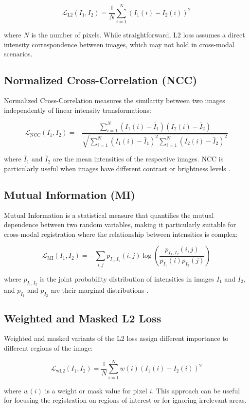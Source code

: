 \begin{equation}
    \mathcal{L}_{\text{L2}}(I_1, I_2) = \frac{1}{N} \sum_{i=1}^{N} (I_1(i) - I_2(i))^2
\end{equation}

where $N$ is the number of pixels. While straightforward, L2 loss assumes a direct intensity correspondence between images, which may not hold in cross-modal scenarios.

\subsection{Normalized Cross-Correlation (NCC)}

Normalized Cross-Correlation measures the similarity between two images independently of linear intensity transformations:

\begin{equation}
    \mathcal{L}_{\text{NCC}}(I_1, I_2) = -\frac{\sum_{i=1}^{N} (I_1(i) - \bar{I}_1)(I_2(i) - \bar{I}_2)}{\sqrt{\sum_{i=1}^{N} (I_1(i) - \bar{I}_1)^2 \sum_{i=1}^{N} (I_2(i) - \bar{I}_2)^2}}
\end{equation}

where $\bar{I}_1$ and $\bar{I}_2$ are the mean intensities of the respective images. NCC is particularly useful when images have different contrast or brightness levels \parencite{nccreg}.

\subsection{Mutual Information (MI)}

Mutual Information is a statistical measure that quantifies the mutual dependence between two random variables, making it particularly suitable for cross-modal registration where the relationship between intensities is complex:

\begin{equation}
    \mathcal{L}_{\text{MI}}(I_1, I_2) = -\sum_{i,j} p_{I_1,I_2}(i,j) \log\left(\frac{p_{I_1,I_2}(i,j)}{p_{I_1}(i)p_{I_2}(j)}\right)
\end{equation}

where $p_{I_1,I_2}$ is the joint probability distribution of intensities in images $I_1$ and $I_2$, and $p_{I_1}$ and $p_{I_2}$ are their marginal distributions \parencite{mi2003}.

\subsection{Weighted and Masked L2 Loss}

Weighted and masked variants of the L2 loss assign different importance to different regions of the image:

\begin{equation}
    \mathcal{L}_{\text{wL2}}(I_1, I_2) = \frac{1}{N} \sum_{i=1}^{N} w(i) (I_1(i) - I_2(i))^2
\end{equation}

where $w(i)$ is a weight or mask value for pixel $i$. This approach can be useful for focusing the registration on regions of interest or for ignoring irrelevant areas.
